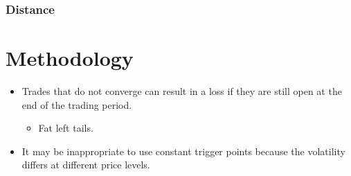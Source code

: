 \documentclass[pdf,9pt,xcolor=dvipsnames,hide notes]{beamer}
\begin{document}
\begin{frame}[label=frame2d]
	\frametitle{Distance}
		\section{Methodology}
		

\begin{itemize}
	\justifying
	
	
	\vspace{0.3cm}
	
	\item Trades that do not converge can result in a loss if they are still open at the end of the trading period.
	
	
	\pause
	
	\begin{itemize}
		\item Fat left tails.
	\end{itemize}
	
	\vspace{0.3cm}
	
	\pause
	\item It may be inappropriate to use constant trigger points because the volatility differs at different price levels.
	
\end{itemize}


\end{frame}
\end{document}
